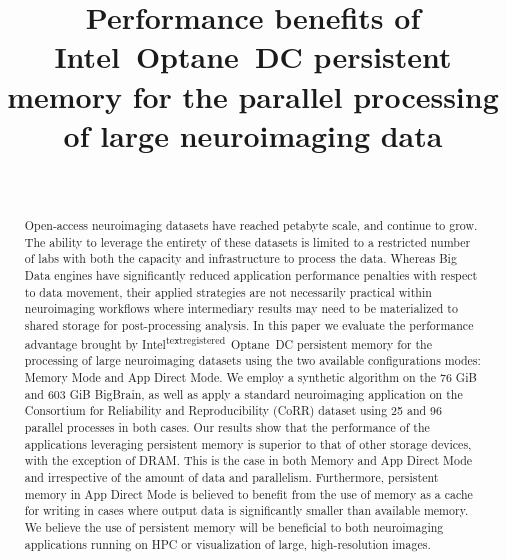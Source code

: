 \documentclass[conference]{IEEEtran}
\begin{document}
\title{Performance benefits of Intel\textsuperscript{\textregistered}~Optane\texttrademark~DC persistent memory for the parallel processing of large neuroimaging data}

\author{\\
}
\maketitle

\begin{abstract}
    Open-access neuroimaging datasets have reached petabyte scale, and continue to grow.
The ability to leverage the entirety of these datasets is limited to a restricted
number of labs with both the capacity and infrastructure to
process the data. Whereas Big Data engines have significantly
reduced application performance penalties with respect to data
movement, their applied strategies are not necessarily practical
within neuroimaging workflows where intermediary results may
need to be materialized to shared storage for post-processing
analysis. In this paper we evaluate the performance advantage
brought by Intel\textsuperscript{textregistered}~Optane\texttrademark~DC persistent memory for the
processing of large neuroimaging datasets using the two available
configurations modes: Memory Mode and App Direct Mode. We
employ a synthetic algorithm on the 76 GiB and 603 GiB BigBrain, as well as apply a
standard neuroimaging application on the Consortium for Reliability
and Reproducibility (CoRR) dataset using 25 and 96 parallel
processes in both cases. Our results show that the performance of
the applications leveraging persistent memory is superior to that of other
storage devices, with the exception of DRAM. This is the case
in both Memory and App Direct Mode and irrespective of the
amount of data and parallelism. Furthermore, persistent memory in App
Direct Mode is believed to benefit from the use of memory as
a cache for writing in cases where output data is significantly
smaller than available memory. We believe the use of persistent memory
will be beneficial to both neuroimaging applications running on
HPC or visualization of large, high-resolution images.
\end{abstract}
\end{document}
